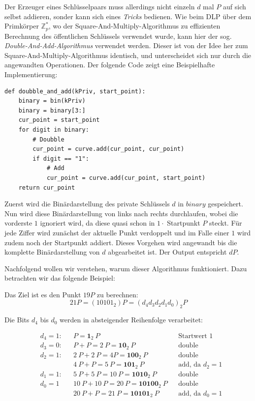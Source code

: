 Der Erzeuger eines Schlüsselpaars muss allerdings nicht einzeln $d$ mal $P$ auf sich selbst addieren, sonder kann sich eines \textit{Tricks} bedienen. Wie beim DLP über dem Primkörper $\mathbb{Z}^*_p$, wo der Square-And-Multiply-Algorithmus zu effizienten Berechnung des öffentlichen Schlüssels verwendet wurde, kann hier der sog. \textit{Double-And-Add-Algorithmus} verwendet werden. Dieser ist von der Idee her zum Square-And-Multiply-Algorithmus identisch, und unterscheidet sich nur durch die angewandten Operationen. Der folgende Code zeigt eine Beispielhafte Implementierung:

\vspace{\baselineskip}
\begin{lstlisting}[caption={Double-And-Add-Algorithmus in Python}, captionpos=b]
def doubble_and_add(kPriv, start_point):
	binary = bin(kPriv)
	binary = binary[3:]
    cur_point = start_point
    for digit in binary:
        # Doubble
	    cur_point = curve.add(cur_point, cur_point)
		if digit == "1":
	        # Add
            cur_point = curve.add(cur_point, start_point)
    return cur_point
\end{lstlisting}
\vspace{\baselineskip}

Zuerst wird die Binärdarstellung des private Schlüssels $d$ in $binary$ gespeichert. Nun wird diese Binärdarstellung von links nach rechts durchlaufen, wobei die vorderste $1$ ignoriert wird, da diese quasi schon in $1 \cdot$ Startpunkt $P$ steckt. Für jede Ziffer wird zunächst der aktuelle Punkt verdoppelt und im Falle einer $1$ wird zudem noch der Startpunkt addiert. Dieses Vorgehen wird angewandt bis die komplette Binärdarstellung von $d$ abgearbeitet ist. Der Output entspricht $dP$.

Nachfolgend wollen wir verstehen, warum dieser Algorithmus funktioniert. Dazu betrachten wir das folgende Beispiel:

Das Ziel ist es den Punkt $19	 P$ zu berechnen:
$$21P = (10101_2)P = (d_4 d_3 d_2 d_1 d_0)_2 P$$

Die Bits $d_4$ bis $d_0$ werden in absteigender Reihenfolge verarbeitet:

\begin{align*}
&d_4 = 1:	&&P = \boldsymbol{1}_2\ P  							&&\text{Startwert 1}\\
&d_3 = 0: 	&&P + P = 2\ P = \boldsymbol{10}_2\ P 				&&\text{double}\\
&d_2 = 1: 	&&2\ P + 2\ P = 4 P = \boldsymbol{100}_2\ P 			&&\text{double}\\
&			&&4\ P + P = 5\ P = \boldsymbol{101}_2\ P 			&&\text{add, da $d_2 = 1$}\\
&d_1 = 1: 	&&5\ P + 5\ P = 10\ P = \boldsymbol{1010}_2\ P 		&&\text{double}\\
&d_0 = 1  	&&10\ P + 10\ P = 20\ P = \boldsymbol{10100}_2\ P 	&&\text{double}\\
&			&&20\ P + P = 21\ P = \boldsymbol{10101}_2\ P 		&&\text{add, da $d_0 = 1$}
\end{align*}

